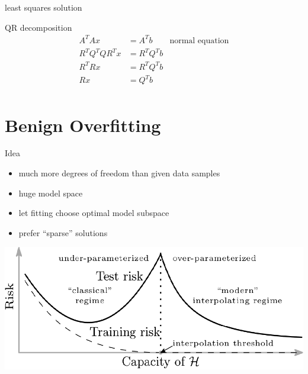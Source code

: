 \documentclass{beamer}
\begin{document}
\begin{frame}{least squares solution}
\begin{block}{QR decomposition}
\begin{align*}
	A^TAx &= A^T b & \text{normal equation}\\
	R^TQ^TQR^Tx &= R^TQ^Tb\\
	R^TRx & = R^TQ^Tb\\
	Rx &= Q^T b\\
\end{align*}
\end{block}
\end{frame}

\section{Benign Overfitting}

\begin{frame}{Idea}
\begin{itemize}
	\item much more degrees of freedom than given data samples
	\item huge model space
	\item let fitting choose optimal model subspace
	\item prefer \enquote{sparse} solutions
\end{itemize}
\vspace{0.1cm}
\pause
\includegraphics[width=\textwidth]{source/BenignOverfittingModel.png}
\end{frame}
\end{document}
